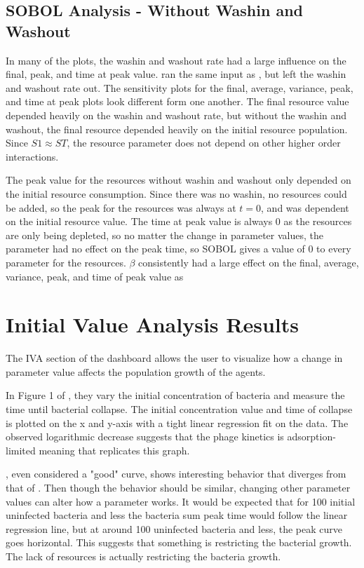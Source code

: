 \subsection{SOBOL Analysis - Without Washin and Washout}
In many of the plots, the washin and washout rate had a large influence on the final, peak, and time at peak value. 
 ran the same input as , but left the washin and washout rate out. 
The sensitivity plots for the final, average, variance, peak, and time at peak plots look different form one another. 
The final resource value depended heavily on the washin and washout rate, but without the washin and washout, the final resource depended heavily on the initial resource population. 
Since $S1 \approx ST$, the resource parameter does not depend on other higher order interactions. 

The peak value for the resources without washin and washout only depended on the initial resource consumption. 
Since there was no washin, no resources could be added, so the peak for the resources was always at $t=0$, and was dependent on the initial resource value. 
The time at peak value is always 0 as the resources are only being depleted, so no matter the change in parameter values, the parameter had no effect on the peak time, so SOBOL gives a value of 0 to every parameter for the resources. 
$\beta$ consistently had a large effect on the final, average, variance, peak, and time of peak value as 


\section{Initial Value Analysis Results}
\label{sec:results:initial_value_analysis}

The IVA section of the dashboard allows the user to visualize how a change in parameter value affects the population growth of the agents. 

In Figure 1 of \citet{mullaExtremeDiversityPhage2024}, they vary the initial concentration of bacteria and measure the time until bacterial collapse. 
The initial concentration value and time of collapse is plotted on the x and y-axis with a tight linear regression fit on the data. 
The observed logarithmic decrease suggests that the phage kinetics is adsorption-limited meaning that 
 replicates this graph. 

, even considered a "good" curve, shows interesting behavior that diverges from that of . 
Then though the behavior should be similar, changing other parameter values can alter how a parameter works. 
It would be expected that for 100 initial uninfected bacteria and less the bacteria sum peak time would follow the linear regression line, but at around 100 uninfected bacteria and less, the peak curve goes horizontal. 
This suggests that something is restricting the bacterial growth. 
The lack of resources is actually restricting the bacteria growth. 


